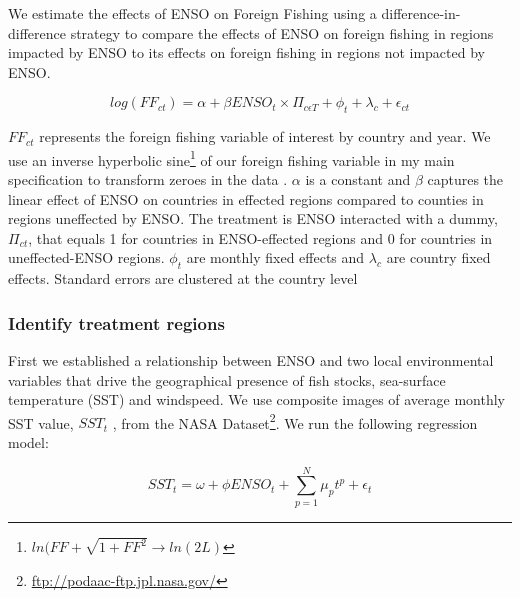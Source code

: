 \documentclass[]{article}
\let\rmarkdownfootnote\footnote%
\def\footnote{\protect\rmarkdownfootnote}
\begin{document}
We estimate the effects of ENSO on Foreign Fishing using a
difference-in-difference strategy to compare the effects of ENSO on
foreign fishing in regions impacted by ENSO to its effects on foreign
fishing in regions not impacted by ENSO.

\[log(FF_{ct}) = \alpha + \beta ENSO_t \times \Pi_{c\epsilon T} + \phi_t + \lambda_c + \epsilon_{ct}\]

\(FF_{ct}\) represents the foreign fishing variable of interest by
country and year. We use an inverse hyperbolic sine\footnote{\(ln(FF + \sqrt{1 + FF^2} \rightarrow ln(2L)\)}
of our foreign fishing variable in my main specification to transform
zeroes in the data \citep{burbidge_1988,card_2017}. \(\alpha\) is a
constant and \(\beta\) captures the linear effect of ENSO on countries
in effected regions compared to counties in regions uneffected by ENSO.
The treatment is ENSO interacted with a dummy, \(\Pi_{ct}\), that equals
1 for countries in ENSO-effected regions and 0 for countries in
uneffected-ENSO regions. \(\phi_t\) are monthly fixed effects and
\(\lambda_c\) are country fixed effects. Standard errors are clustered
at the country level

\subsubsection{Identify treatment
regions}\label{identify-treatment-regions}

First we established a relationship between ENSO and two local
environmental variables that drive the geographical presence of fish
stocks, sea-surface temperature (SST) and windspeed. We use composite
images of average monthly SST value, \(SST_t\) , from the NASA
Dataset\footnote{\url{ftp://podaac-ftp.jpl.nasa.gov/}}. We run the
following regression model:

\[SST_t = \omega + \phi ENSO_t + \sum_{p = 1}^{N}{\mu_pt^p} + \epsilon_t\]
\end{document}
